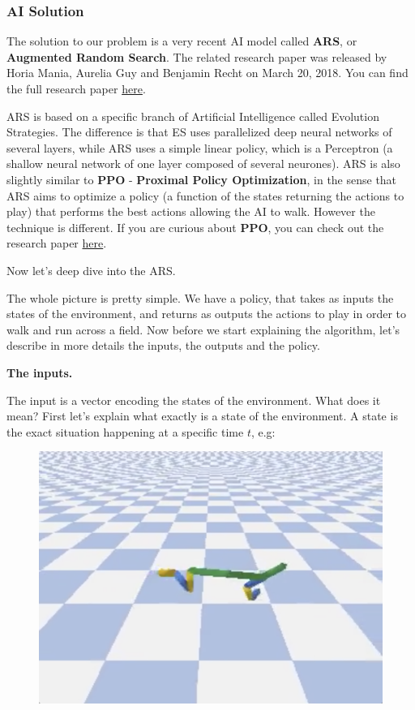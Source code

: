 \documentclass[]{book}
\begin{document}
\subsubsection{AI Solution}

The solution to our problem is a very recent AI model called \textbf{ARS}, or \textbf{Augmented Random Search}. The related research paper was released by Horia Mania, Aurelia Guy and Benjamin Recht on March 20, 2018. You can find the full research paper \href{https://arxiv.org/pdf/1803.07055.pdf}{here}.

ARS is based on a specific branch of Artificial Intelligence called Evolution Strategies. The difference is that ES uses parallelized deep neural networks of several layers, while ARS uses a simple linear policy, which is a Perceptron (a shallow neural network of one layer composed of several neurones). ARS is also slightly similar to \textbf{PPO} - \textbf{Proximal Policy Optimization}, in the sense that ARS aims to optimize a policy (a function of the states returning the actions to play) that performs the best actions allowing the AI to walk. However the technique is different. If you are curious about \textbf{PPO}, you can check out the research paper \href{https://arxiv.org/pdf/1707.06347.pdf}{here}.

Now let's deep dive into the ARS.

The whole picture is pretty simple. We have a policy, that takes as inputs the states of the environment, and returns as outputs the actions to play in order to walk and run across a field. Now before we start explaining the algorithm, let's describe in more details the inputs, the outputs and the policy.

\textbf{The inputs.}

The input is a vector encoding the states of the environment. What does it mean? First let's explain what exactly is a state of the environment. A state is the exact situation happening at a specific time \(t\), e.g:

\begin{figure}[!htbp]
        \begin{center}
            \includegraphics[scale=0.5]{Cheetah_in_the_air.png}
        \end{center}
\end{figure}
\end{document}
